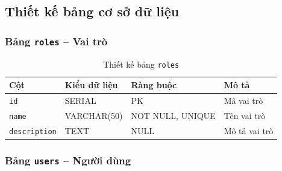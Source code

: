 \subsection{Thiết kế bảng cơ sở dữ liệu}


\subsubsection{Bảng \texttt{roles} -- Vai trò}

\begin{table}[H]
\centering
\caption{Thiết kế bảng \texttt{roles}}
\begin{tabularx}{\textwidth}{|l|l|Z|Z|}
\hline
\textbf{Cột} &
\textbf{Kiểu dữ liệu} &
\textbf{Ràng buộc} &
\textbf{Mô tả} \\ \hline

\texttt{id}
& SERIAL
& PK
& Mã vai trò \\ \hline

\texttt{name}
& VARCHAR(50)
& NOT NULL, UNIQUE
& Tên vai trò \\ \hline

\texttt{description}
& TEXT
& NULL
& Mô tả vai trò \\ \hline

\end{tabularx}
\end{table}



\subsubsection{Bảng \texttt{users} -- Người dùng}

